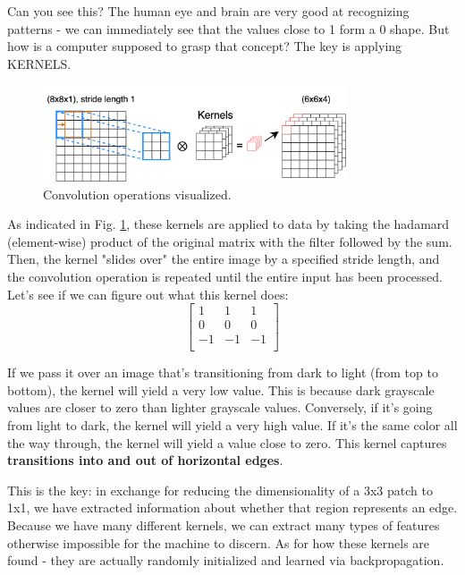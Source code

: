 \documentclass[12pt]{article}
\begin{document}
Can you see this? The human eye and brain are very good at recognizing patterns - we can immediately see that the values close to 1 form a 0 shape. But how is a computer supposed to grasp that concept? The key is applying KERNELS. 

\begin{figure}[H]
    \centering
    \includegraphics[width=0.8\textwidth]{../media/convolutions.png}
    \caption{Convolution operations visualized. }
    \label{fig:convolutions}
\end{figure}


As indicated in Fig. \ref{fig:convolutions}, these kernels are applied to data by taking the hadamard (element-wise) product of the original matrix with the filter followed by the sum. Then, the kernel "slides over" the entire image by a specified stride length, and the convolution operation is repeated until the entire input has been processed. Let's see if we can figure out what this kernel does:
\[
\begin{bmatrix}
1 & 1 & 1 \\
0 & 0 & 0 \\
-1 & -1 & -1 \\
\end{bmatrix}
\]

If we pass it over an image that's transitioning from dark to light (from top to bottom), the kernel will yield a very low value. This is because dark grayscale values are closer to zero than lighter grayscale values. Conversely, if it's going from light to dark, the kernel will yield a very high value. If it's the same color all the way through, the kernel will yield a value close to zero. This kernel captures \textbf{transitions into and out of horizontal edges}. 

This is the key: in exchange for reducing the dimensionality of a 3x3 patch to 1x1, we have extracted information about whether that region represents an edge. Because we have many different kernels, we can extract many types of features otherwise impossible for the machine to discern. As for how these kernels are found - they are actually randomly initialized and learned via backpropagation. 
\end{document}
